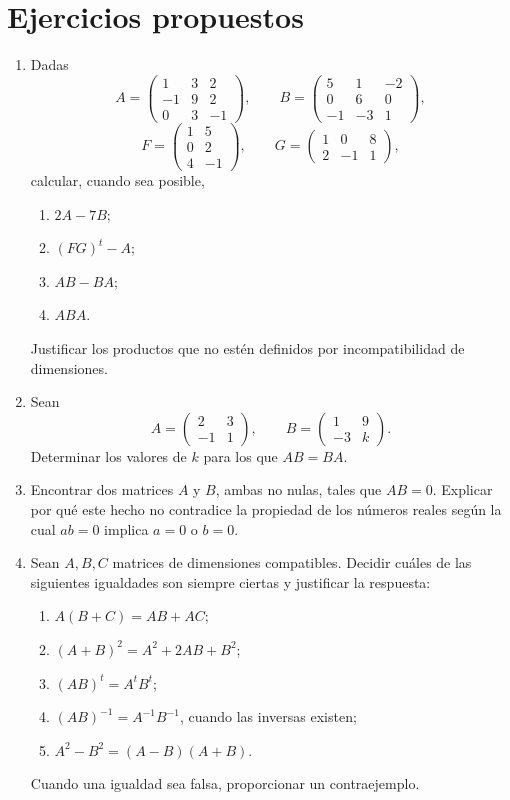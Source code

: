 \section*{Ejercicios propuestos}

\begin{enumerate}[label=\textbf{\arabic*.},leftmargin=*]

\item Dadas
\[
A=\begin{pmatrix}1&3&2\\-1&9&2\\0&3&-1\end{pmatrix},
\qquad
B=\begin{pmatrix}5&1&-2\\0&6&0\\-1&-3&1\end{pmatrix},
\]
\[
F=\begin{pmatrix}1&5\\0&2\\4&-1\end{pmatrix},
\qquad
G=\begin{pmatrix}1&0&8\\2&-1&1\end{pmatrix},
\]
calcular, cuando sea posible,
\begin{enumerate}[label=\alph*)]
\item $2A-7B$;
\item $(FG)^t-A$;
\item $AB-BA$;
\item $ABA$.
\end{enumerate}
Justificar los productos que no estén definidos por incompatibilidad de dimensiones.

\item Sean
\[
A=\begin{pmatrix}2&3\\-1&1\end{pmatrix},
\qquad
B=\begin{pmatrix}1&9\\-3&k\end{pmatrix}.
\]
Determinar los valores de $k$ para los que $AB=BA$.

\item Encontrar dos matrices $A$ y $B$, ambas no nulas, tales que $AB=0$. Explicar por qué este hecho no contradice la propiedad de los números reales según la cual $ab=0$ implica $a=0$ o $b=0$.

\item Sean $A,B,C$ matrices de dimensiones compatibles. Decidir cuáles de las siguientes igualdades son siempre ciertas y justificar la respuesta:
\begin{enumerate}[label=\alph*)]
\item $A(B+C)=AB+AC$;
\item $(A+B)^2=A^2+2AB+B^2$;
\item $(AB)^t=A^tB^t$;
\item $(AB)^{-1}=A^{-1}B^{-1}$, cuando las inversas existen;
\item $A^2-B^2=(A-B)(A+B)$.
\end{enumerate}
Cuando una igualdad sea falsa, proporcionar un contraejemplo.


\end{enumerate}
